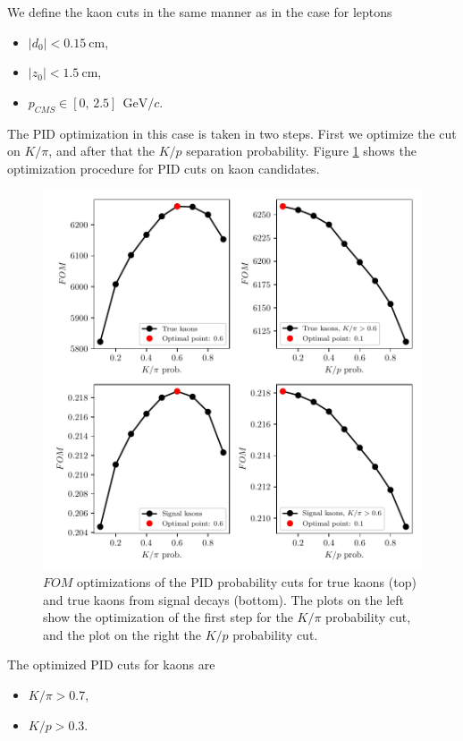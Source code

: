 \documentclass[oneside,a4paper,openany,12pt]{scrbook}
\newcommand {\e}[1]{\mathrm{~#1}}
\begin{document}
We define the kaon cuts in the same manner as in the case for leptons
\begin{itemize}
\item $\vert d_0 \vert < 0.15\e{cm}$,
\item $\vert z_0 \vert < 1.5\e{cm}$,
\item $p_{CMS} \in [0,\,2.5]~\e{GeV}/c$.
\end{itemize}

The PID optimization in this case is taken in two steps. First we optimize the cut on $K / \pi$, and after that the $K/p$ separation probability. Figure \ref{fig:Kfom} shows the optimization procedure for PID cuts on kaon candidates.

\begin{figure}[H]
\centering
\captionsetup{width=.7\linewidth}
\includegraphics[scale=0.8]{fig/FSP_kaon_fom}
\caption{$FOM$ optimizations of the PID probability cuts for true kaons (top) and true kaons from signal decays (bottom). The plots on the left show the optimization of the first step for the $K / \pi$ probability cut, and the plot on the right the $K/p$ probability cut.}
\label{fig:Kfom}
\end{figure}

The optimized PID cuts for kaons are
\begin{itemize}
\item $K/\pi > 0.7$,
\item $K/p > 0.3$.
\end{itemize}
\end{document}
